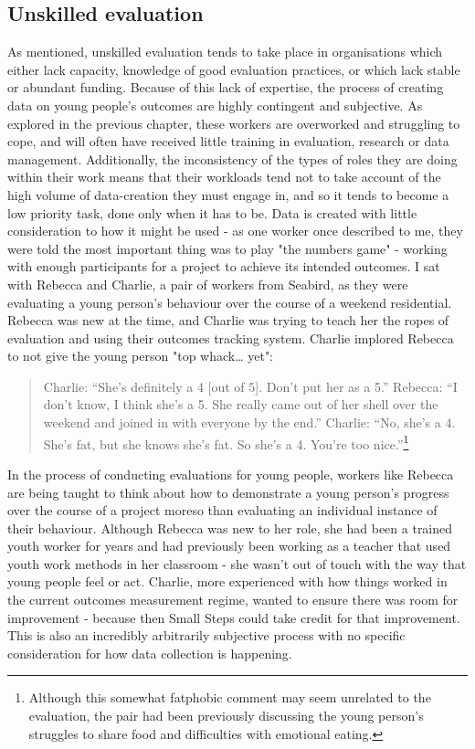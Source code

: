 \subsection{Unskilled evaluation}
\label{subsec:6-4-1-unskilled-eval}
As mentioned, unskilled evaluation tends to take place in organisations which either lack capacity, knowledge of good evaluation practices, or which lack stable or abundant funding. Because of this lack of expertise, the process of creating data on young people's outcomes are highly contingent and subjective. As explored in the previous chapter, these workers are overworked and struggling to cope, and will often have received little training in evaluation, research or data management. Additionally, the inconsistency of the types of roles they are doing within their work means that their workloads tend not to take account of the high volume of data-creation they must engage in, and so it tends to become a low priority task, done only when it has to be. Data is created with little consideration to how it might be used - as one worker once described to me, they were told the most important thing was to play "the numbers game" - working with enough participants for a project to achieve its intended outcomes. I sat with Rebecca and Charlie, a pair of workers from Seabird, as they were evaluating a young person’s behaviour over the course of a weekend residential. Rebecca was new at the time, and Charlie was trying to teach her the ropes of evaluation and using their outcomes tracking system. Charlie implored Rebecca to not give the young person "top whack… yet":
\begin{quote}
Charlie: “She’s definitely a 4 [out of 5]. Don’t put her as a 5.”
Rebecca: “I don’t know, I think she’s a 5. She really came out of her shell over the weekend and joined in with everyone by the end.”
Charlie: “No, she’s a 4. She’s fat, but she knows she’s fat. So she’s a 4. You’re too nice.”\footnote{Although  this somewhat fatphobic comment may seem unrelated to the evaluation, the pair had been previously discussing the young person's struggles to share food and difficulties with emotional eating.}
\end{quote}
In the process of conducting evaluations for young people, workers like Rebecca are being taught to think about how to demonstrate a young person’s progress over the course of a project moreso than evaluating an individual instance of their behaviour. Although Rebecca was new to her role, she had been a trained youth worker for years and had previously been working as a teacher that used youth work methods in her classroom - she wasn't out of touch with the way that young people feel or act. Charlie, more experienced with how things worked in the current outcomes measurement regime, wanted to ensure there was room for improvement - because then Small Steps could take credit for that improvement. This is also an incredibly arbitrarily subjective process with no specific consideration for how data collection is happening.


